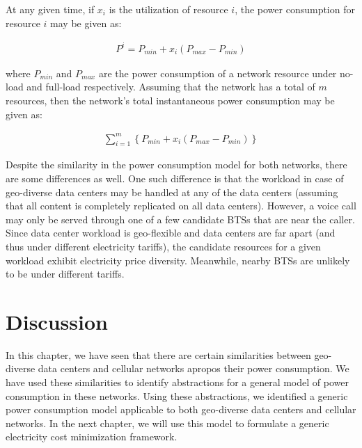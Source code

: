 At any given time, if $x_i$ is the utilization of resource $i$, the power consumption for resource $i$ may be given as:

\begin{align}
P^i = P_{min} + x_i (P_{max} - P_{min})
\end{align}

where $P_{min}$ and $P_{max}$ are the power consumption of a network resource under no-load and full-load respectively. Assuming that the network has a total of $m$ resources, then the network's total instantaneous power consumption may be given as:

\begin{align}
\sum_{i=1}^m \left\{ P_{min} + x_i (P_{max} - P_{min}) \right\}
\label{eq:abdcpaper}
\end{align}

Despite the similarity in the power consumption model for both networks, there are some differences as well. One such difference is that the workload in case of geo-diverse data centers may be handled at any of the data centers (assuming that all content is completely replicated on all data centers). However, a voice call may only be served through one of a few candidate BTSs that are near the caller. Since data center workload is geo-flexible and data centers are far apart (and thus under different electricity tariffs), the candidate resources for a given workload exhibit electricity price diversity. Meanwhile, nearby BTSs are unlikely to be under different tariffs. 

\section{Discussion}
In this chapter, we have seen that there are certain similarities between geo-diverse data centers and cellular networks apropos their power consumption. We have used these similarities to identify abstractions for a general model of power consumption in these networks. Using these abstractions, we identified a generic power consumption model applicable to both geo-diverse data centers and cellular networks. In the next chapter, we will use this model to formulate a generic electricity cost minimization framework.
